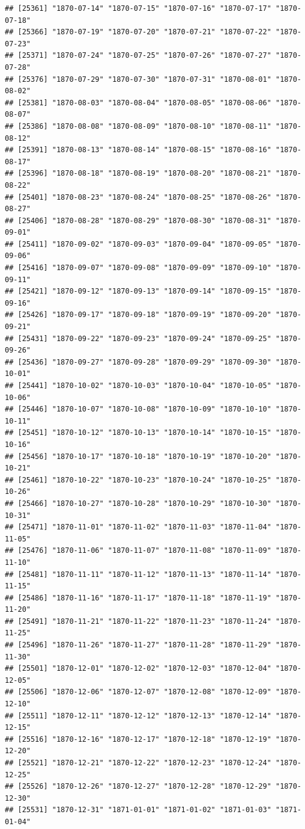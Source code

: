 \documentclass{article}\usepackage[]{graphicx}\usepackage[]{color}
\makeatletter
\newenvironment{kframe}{%
 \def\at@end@of@kframe{}%
 \ifinner\ifhmode%
  \def\at@end@of@kframe{\end{minipage}}%
  \begin{minipage}{\columnwidth}%
 \fi\fi%
 \def\FrameCommand##1{\hskip\@totalleftmargin \hskip-\fboxsep
 \colorbox{shadecolor}{##1}\hskip-\fboxsep
     \hskip-\linewidth \hskip-\@totalleftmargin \hskip\columnwidth}%
 \MakeFramed {\advance\hsize-\width
   \@totalleftmargin\z@ \linewidth\hsize
   \@setminipage}}%
 {\par\unskip\endMakeFramed%
 \at@end@of@kframe}
\newenvironment{knitrout}{}{} %
\makeatother
\begin{document}
\begin{description}
\begin{knitrout}
\begin{kframe}
\begin{verbatim}
## [25361] "1870-07-14" "1870-07-15" "1870-07-16" "1870-07-17" "1870-07-18"
## [25366] "1870-07-19" "1870-07-20" "1870-07-21" "1870-07-22" "1870-07-23"
## [25371] "1870-07-24" "1870-07-25" "1870-07-26" "1870-07-27" "1870-07-28"
## [25376] "1870-07-29" "1870-07-30" "1870-07-31" "1870-08-01" "1870-08-02"
## [25381] "1870-08-03" "1870-08-04" "1870-08-05" "1870-08-06" "1870-08-07"
## [25386] "1870-08-08" "1870-08-09" "1870-08-10" "1870-08-11" "1870-08-12"
## [25391] "1870-08-13" "1870-08-14" "1870-08-15" "1870-08-16" "1870-08-17"
## [25396] "1870-08-18" "1870-08-19" "1870-08-20" "1870-08-21" "1870-08-22"
## [25401] "1870-08-23" "1870-08-24" "1870-08-25" "1870-08-26" "1870-08-27"
## [25406] "1870-08-28" "1870-08-29" "1870-08-30" "1870-08-31" "1870-09-01"
## [25411] "1870-09-02" "1870-09-03" "1870-09-04" "1870-09-05" "1870-09-06"
## [25416] "1870-09-07" "1870-09-08" "1870-09-09" "1870-09-10" "1870-09-11"
## [25421] "1870-09-12" "1870-09-13" "1870-09-14" "1870-09-15" "1870-09-16"
## [25426] "1870-09-17" "1870-09-18" "1870-09-19" "1870-09-20" "1870-09-21"
## [25431] "1870-09-22" "1870-09-23" "1870-09-24" "1870-09-25" "1870-09-26"
## [25436] "1870-09-27" "1870-09-28" "1870-09-29" "1870-09-30" "1870-10-01"
## [25441] "1870-10-02" "1870-10-03" "1870-10-04" "1870-10-05" "1870-10-06"
## [25446] "1870-10-07" "1870-10-08" "1870-10-09" "1870-10-10" "1870-10-11"
## [25451] "1870-10-12" "1870-10-13" "1870-10-14" "1870-10-15" "1870-10-16"
## [25456] "1870-10-17" "1870-10-18" "1870-10-19" "1870-10-20" "1870-10-21"
## [25461] "1870-10-22" "1870-10-23" "1870-10-24" "1870-10-25" "1870-10-26"
## [25466] "1870-10-27" "1870-10-28" "1870-10-29" "1870-10-30" "1870-10-31"
## [25471] "1870-11-01" "1870-11-02" "1870-11-03" "1870-11-04" "1870-11-05"
## [25476] "1870-11-06" "1870-11-07" "1870-11-08" "1870-11-09" "1870-11-10"
## [25481] "1870-11-11" "1870-11-12" "1870-11-13" "1870-11-14" "1870-11-15"
## [25486] "1870-11-16" "1870-11-17" "1870-11-18" "1870-11-19" "1870-11-20"
## [25491] "1870-11-21" "1870-11-22" "1870-11-23" "1870-11-24" "1870-11-25"
## [25496] "1870-11-26" "1870-11-27" "1870-11-28" "1870-11-29" "1870-11-30"
## [25501] "1870-12-01" "1870-12-02" "1870-12-03" "1870-12-04" "1870-12-05"
## [25506] "1870-12-06" "1870-12-07" "1870-12-08" "1870-12-09" "1870-12-10"
## [25511] "1870-12-11" "1870-12-12" "1870-12-13" "1870-12-14" "1870-12-15"
## [25516] "1870-12-16" "1870-12-17" "1870-12-18" "1870-12-19" "1870-12-20"
## [25521] "1870-12-21" "1870-12-22" "1870-12-23" "1870-12-24" "1870-12-25"
## [25526] "1870-12-26" "1870-12-27" "1870-12-28" "1870-12-29" "1870-12-30"
## [25531] "1870-12-31" "1871-01-01" "1871-01-02" "1871-01-03" "1871-01-04"

\end{verbatim}
\end{kframe}
\end{knitrout}
\end{description}
\end{document}
